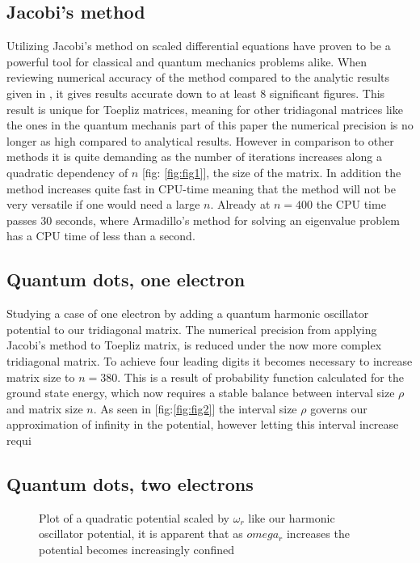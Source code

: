 \documentclass{emulateapj}
\begin{document}
\subsection{Jacobi's method}
Utilizing Jacobi's method on scaled differential equations have proven to be a powerful tool for classical and quantum mechanics problems alike. When reviewing numerical accuracy of the method  compared to the analytic results given in \cite{2}, it gives results accurate down to at least 8 significant figures. This result is unique for Toepliz matrices, meaning for other tridiagonal matrices like the ones in the quantum mechanis part of this paper the numerical precision is no longer as high compared to analytical results. However in comparison to other methods it is quite demanding as the number of iterations increases along a quadratic dependency of $n$ [fig: \ref{fig:fig1}], the size of the matrix. In addition the method increases quite fast in CPU-time meaning that the method will not be very versatile if one would need a large $n$. Already at $n = 400$ the CPU time passes $30$ seconds, where Armadillo's method for solving an eigenvalue problem has a CPU time of less than a second.

\subsection{Quantum dots, one electron}
Studying a case of one electron by adding a quantum harmonic oscillator potential to our tridiagonal matrix. The numerical precision from applying Jacobi's method to Toepliz matrix, is reduced under the now more complex tridiagonal matrix. To achieve four leading digits it becomes necessary to increase matrix size to $n = 380$. This is a result of probability function calculated for the ground state energy, which now requires a stable balance between interval size $\rho$ and matrix size $n$. As seen in [fig:\ref{fig:fig2}] the interval size $\rho$ governs our approximation of infinity in the potential, however letting this interval increase requi

\subsection{Quantum dots, two electrons}

\begin{figure}[H]
\mbox{}
\caption{Plot of a quadratic potential scaled by $\omega_{r}$ like our harmonic oscillator potential, it is apparent that as $omega_{r}$ increases the potential becomes increasingly confined}
\label{fig:fig5}
\end{figure}
\end{document}
